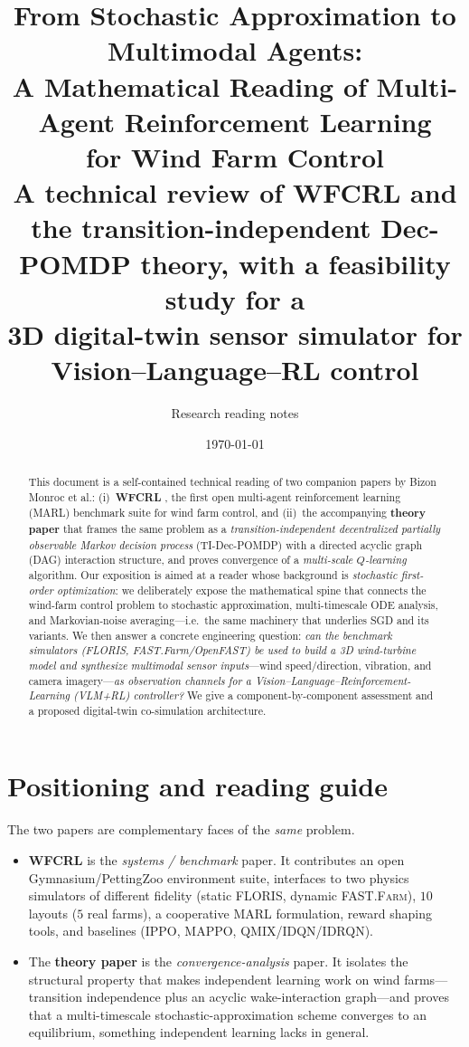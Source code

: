 \documentclass[11pt]{article}
\title{\textbf{From Stochastic Approximation to Multimodal Agents:\\
A Mathematical Reading of Multi-Agent Reinforcement Learning\\
for Wind Farm Control}\\[4pt]
\large A technical review of WFCRL and the transition-independent
Dec-POMDP theory, with a feasibility study for a\\
3D digital-twin sensor simulator for Vision--Language--RL control}
\author{Research reading notes}
\date{\today}
\theoremstyle{plain}
\theoremstyle{definition}
\begin{document}
\maketitle

\begin{abstract}
\noindent
This document is a self-contained technical reading of two companion papers
by Bizon Monroc et al.: (i)~\textbf{WFCRL} \cite{P1}, the first open
multi-agent reinforcement learning (MARL) benchmark suite for wind farm
control, and (ii)~the accompanying \textbf{theory paper} \cite{P2} that frames
the same problem as a \emph{transition-independent decentralized partially
observable Markov decision process} (TI-Dec-POMDP) with a directed acyclic
graph (DAG) interaction structure, and proves convergence of a
\emph{multi-scale $Q$-learning} algorithm. Our exposition is aimed at a
reader whose background is \emph{stochastic first-order optimization}:
we deliberately expose the mathematical spine that connects the wind-farm
control problem to stochastic approximation, multi-timescale ODE analysis,
and Markovian-noise averaging---i.e.\ the same machinery that underlies SGD
and its variants. We then answer a concrete engineering question: \emph{can
the benchmark simulators (FLORIS, FAST.Farm/OpenFAST) be used to build a 3D
wind-turbine model and synthesize multimodal sensor inputs}---wind
speed/direction, vibration, and camera imagery---\emph{as observation
channels for a Vision--Language--Reinforcement-Learning (VLM+RL) controller?}
We give a component-by-component assessment and a proposed digital-twin
co-simulation architecture.
\end{abstract}

\tableofcontents

\section{Positioning and reading guide}

The two papers are complementary faces of the \emph{same} problem.

\begin{itemize}[leftmargin=1.4em]
  \item \textbf{WFCRL} \cite{P1} is the \emph{systems / benchmark} paper. It
  contributes an open Gymnasium/PettingZoo environment suite, interfaces to
  two physics simulators of different fidelity (static \textsc{FLORIS},
  dynamic \textsc{FAST.Farm}), $10$ layouts ($5$ real farms), a cooperative
  MARL formulation, reward shaping tools, and baselines
  (IPPO, MAPPO, QMIX/IDQN/IDRQN).

  \item The \textbf{theory paper} \cite{P2} is the \emph{convergence-analysis}
  paper. It isolates the structural property that makes independent learning
  work on wind farms---transition independence plus an acyclic wake-interaction
  graph---and proves that a multi-timescale stochastic-approximation scheme
  converges to an equilibrium, something independent learning lacks in general.
\end{itemize}
\end{document}
